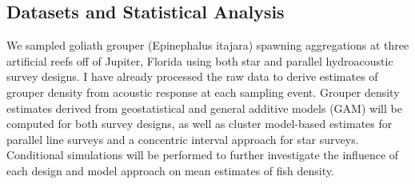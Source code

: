 \documentclass[]{article}
\begin{document}
\subsection{Datasets and Statistical
Analysis}\label{datasets-and-statistical-analysis}

We sampled goliath grouper (Epinephalus itajara) spawning aggregations
at three artificial reefs off of Jupiter, Florida using both star and
parallel hydroacoustic survey designs. I have already processed the raw
data to derive estimates of grouper density from acoustic response at
each sampling event. Grouper density estimates derived from
geostatistical and general additive models (GAM) will be computed for
both survey designs, as well as cluster model-based estimates for
parallel line surveys and a concentric interval approach for star
surveys. Conditional simulations will be performed to further
investigate the influence of each design and model approach on mean
estimates of fish density.
\end{document}
